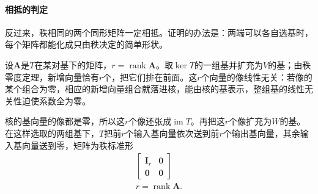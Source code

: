 \paragraph{相抵的判定}
\label{sec:ls-equivalence-conditions}
反过来，秩相同的两个同形矩阵一定相抵。证明的办法是：两端可以各自选基时，每个矩阵都能化成只由秩决定的简单形状。

设$\bm A$是$T$在某对基下的矩阵，$r=\operatorname{rank}\bm A$。取$\ker T$的一组基并扩充为$V$的基；由秩零度定理，新增向量恰有$r$个，把它们排在前面。这$r$个向量的像线性无关：若像的某个组合为零，相应的新增向量组合就落进核，能由核的基表示，整组基的线性无关性迫使系数全为零。

核的基向量的像都是零，所以这$r$个像还张成$\operatorname{im}T$。再把这$r$个像扩充为$W$的基。在这样选取的两组基下，$T$把前$r$个输入基向量依次送到前$r$个输出基向量，其余输入基向量送到零，矩阵为秩标准形
\begin{equation}
\begin{gathered}
\begin{bmatrix}\bm I_r&\bm0\\\bm0&\bm0\end{bmatrix}\\
r=\operatorname{rank}\bm A.
\end{gathered}
\label{eq:ls-rank-normal-form}
\end{equation}

